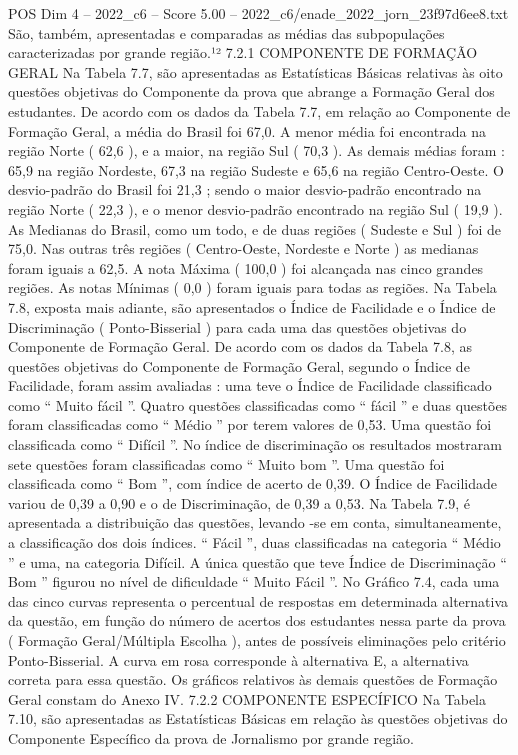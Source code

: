 \begin{textsample}{POS Dim 4 – 2022\_c6 – Score 5.00 – 2022\_c6/enade\_2022\_jorn\_23f97d6ee8.txt}
São, também, apresentadas e comparadas as médias das subpopulações caracterizadas por grande região.¹² 7.2.1 COMPONENTE DE FORMAÇÃO GERAL Na Tabela 7.7, são apresentadas as Estatísticas Básicas relativas às oito questões objetivas do Componente da prova que abrange a Formação Geral dos estudantes.
De acordo com os dados da Tabela 7.7, em relação ao Componente de Formação Geral, a média do Brasil foi 67,0.
A menor média foi encontrada na região Norte ( 62,6 ), e a maior, na região Sul ( 70,3 ).
As demais médias foram : 65,9 na região Nordeste, 67,3 na região Sudeste e 65,6 na região Centro-Oeste.
O desvio-padrão do Brasil foi 21,3 ; sendo o maior desvio-padrão encontrado na região Norte ( 22,3 ), e o menor desvio-padrão encontrado na região Sul ( 19,9 ).
As Medianas do Brasil, como um todo, e de duas regiões ( Sudeste e Sul ) foi de 75,0.
Nas outras três regiões ( Centro-Oeste, Nordeste e Norte ) as medianas foram iguais a 62,5.
A nota Máxima ( 100,0 ) foi alcançada nas cinco grandes regiões.
As notas Mínimas ( 0,0 ) foram iguais para todas as regiões.
Na Tabela 7.8, exposta mais adiante, são apresentados o Índice de Facilidade e o Índice de Discriminação ( Ponto-Bisserial ) para cada uma das questões objetivas do Componente de Formação Geral.
De acordo com os dados da Tabela 7.8, as questões objetivas do Componente de Formação Geral, segundo o Índice de Facilidade, foram assim avaliadas : uma teve o Índice de Facilidade classificado como “ Muito fácil ”.
Quatro questões classificadas como “ fácil ” e duas questões foram classificadas como “ Médio ” por terem valores de 0,53.
Uma questão foi classificada como “ Difícil ”.
No índice de discriminação os resultados mostraram sete questões foram classificadas como “ Muito bom ”.
Uma questão foi classificada como “ Bom ”, com índice de acerto de 0,39.
O Índice de Facilidade variou de 0,39 a 0,90 e o de Discriminação, de 0,39 a 0,53.
Na Tabela 7.9, é apresentada a distribuição das questões, levando -se em conta, simultaneamente, a classificação dos dois índices. “ Fácil ”, duas classificadas na categoria “ Médio ” e uma, na categoria Difícil.
A única questão que teve Índice de Discriminação “ Bom ” figurou no nível de dificuldade “ Muito Fácil ”.
No Gráfico 7.4, cada uma das cinco curvas representa o percentual de respostas em determinada alternativa da questão, em função do número de acertos dos estudantes nessa parte da prova ( Formação Geral/Múltipla Escolha ), antes de possíveis eliminações pelo critério Ponto-Bisserial.
A curva em rosa corresponde à alternativa E, a alternativa correta para essa questão.
Os gráficos relativos às demais questões de Formação Geral constam do Anexo IV. 7.2.2 COMPONENTE ESPECÍFICO Na Tabela 7.10, são apresentadas as Estatísticas Básicas em relação às questões objetivas do Componente Específico da prova de Jornalismo por grande região.

\end{textsample}
